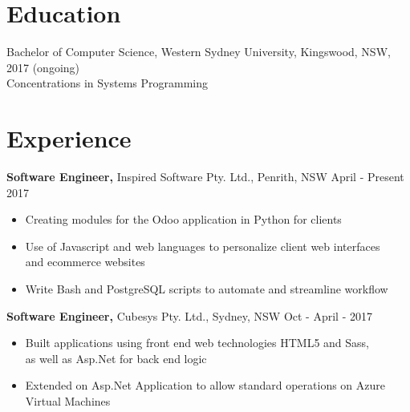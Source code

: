 \documentclass[margin]{res}
\begin{document}

\address{{\bf Present Address} \\ 10 Joseph Street \\ Kingswood, NSW 2747  \\
        0414329597 }
\address{{\bf Email Address} \\ ben.hili1994@gmail.com }


\begin{resume}

\section{Education}
Bachelor of Computer Science, Western Sydney University, Kingswood, NSW, 2017 (ongoing) \\
Concentrations in Systems Programming

\section{Experience}
{\bf Software Engineer,} Inspired Software Pty. Ltd., Penrith, NSW \hfill April - Present 2017
\begin{itemize} \itemsep 0pt  %
\item Creating modules for the Odoo application in Python for clients

\item Use of Javascript and web languages to personalize client web interfaces \\
            and ecommerce websites

\item Write Bash and PostgreSQL scripts to automate and streamline workflow
\end{itemize}

 {\bf Software Engineer,} Cubesys Pty. Ltd., Sydney, NSW \hfill Oct - April - 2017
 \begin{itemize} \itemsep 0pt  %
 \item Built applications using front end web technologies HTML5 and Sass, \\
       as well as Asp.Net for back end logic

 \item Extended on Asp.Net Application to allow standard operations on Azure \\
       Virtual Machines


\end{itemize}
\end{resume}
\end{document}
